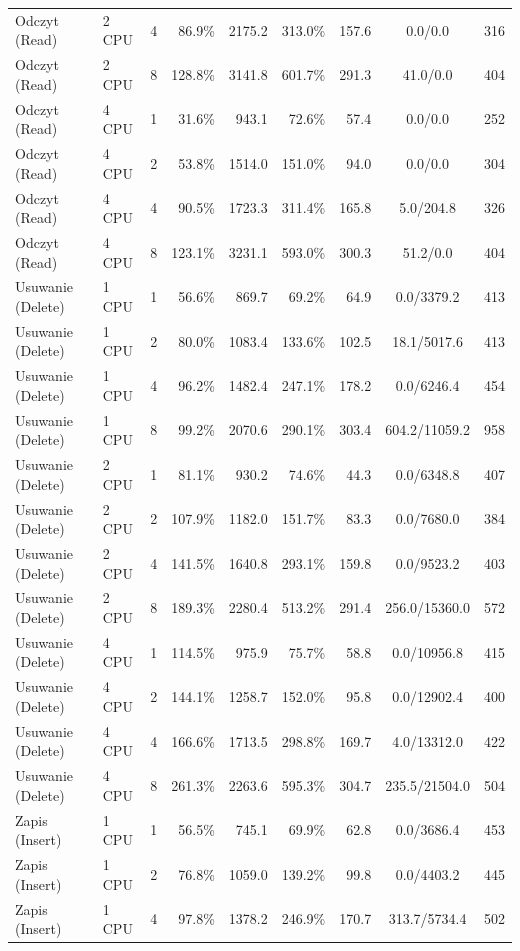 \begin{table}[ht]
{\begin{tabular}{llcrrrrcc}
Odczyt (Read) & 2 CPU & 4 & 86.9\% & 2175.2 & 313.0\% & 157.6 & 0.0/0.0 & 316 \\
Odczyt (Read) & 2 CPU & 8 & 128.8\% & 3141.8 & 601.7\% & 291.3 & 41.0/0.0 & 404 \\
Odczyt (Read) & 4 CPU & 1 & 31.6\% & 943.1 & 72.6\% & 57.4 & 0.0/0.0 & 252 \\
Odczyt (Read) & 4 CPU & 2 & 53.8\% & 1514.0 & 151.0\% & 94.0 & 0.0/0.0 & 304 \\
Odczyt (Read) & 4 CPU & 4 & 90.5\% & 1723.3 & 311.4\% & 165.8 & 5.0/204.8 & 326 \\
Odczyt (Read) & 4 CPU & 8 & 123.1\% & 3231.1 & 593.0\% & 300.3 & 51.2/0.0 & 404 \\
Usuwanie (Delete) & 1 CPU & 1 & 56.6\% & 869.7 & 69.2\% & 64.9 & 0.0/3379.2 & 413 \\
Usuwanie (Delete) & 1 CPU & 2 & 80.0\% & 1083.4 & 133.6\% & 102.5 & 18.1/5017.6 & 413 \\
Usuwanie (Delete) & 1 CPU & 4 & 96.2\% & 1482.4 & 247.1\% & 178.2 & 0.0/6246.4 & 454 \\
Usuwanie (Delete) & 1 CPU & 8 & 99.2\% & 2070.6 & 290.1\% & 303.4 & 604.2/11059.2 & 958 \\
Usuwanie (Delete) & 2 CPU & 1 & 81.1\% & 930.2 & 74.6\% & 44.3 & 0.0/6348.8 & 407 \\
Usuwanie (Delete) & 2 CPU & 2 & 107.9\% & 1182.0 & 151.7\% & 83.3 & 0.0/7680.0 & 384 \\
Usuwanie (Delete) & 2 CPU & 4 & 141.5\% & 1640.8 & 293.1\% & 159.8 & 0.0/9523.2 & 403 \\
Usuwanie (Delete) & 2 CPU & 8 & 189.3\% & 2280.4 & 513.2\% & 291.4 & 256.0/15360.0 & 572 \\
Usuwanie (Delete) & 4 CPU & 1 & 114.5\% & 975.9 & 75.7\% & 58.8 & 0.0/10956.8 & 415 \\
Usuwanie (Delete) & 4 CPU & 2 & 144.1\% & 1258.7 & 152.0\% & 95.8 & 0.0/12902.4 & 400 \\
Usuwanie (Delete) & 4 CPU & 4 & 166.6\% & 1713.5 & 298.8\% & 169.7 & 4.0/13312.0 & 422 \\
Usuwanie (Delete) & 4 CPU & 8 & 261.3\% & 2263.6 & 595.3\% & 304.7 & 235.5/21504.0 & 504 \\
Zapis (Insert) & 1 CPU & 1 & 56.5\% & 745.1 & 69.9\% & 62.8 & 0.0/3686.4 & 453 \\
Zapis (Insert) & 1 CPU & 2 & 76.8\% & 1059.0 & 139.2\% & 99.8 & 0.0/4403.2 & 445 \\
Zapis (Insert) & 1 CPU & 4 & 97.8\% & 1378.2 & 246.9\% & 170.7 & 313.7/5734.4 & 502 \\

\end{tabular}}
\end{table}
